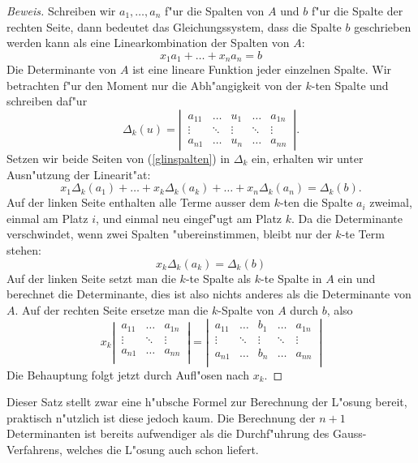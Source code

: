 \begin{proof}[Beweis]
Schreiben wir $a_1,\dots,a_n$ f"ur die Spalten von $A$ und $b$ f"ur die 
Spalte der rechten Seite, dann bedeutet das Gleichungssystem, dass die
Spalte $b$ geschrieben werden kann als eine Linearkombination der
Spalten von $A$:
\begin{equation}
x_1a_1+\dots +x_na_n=b
\label{glinspalten}
\end{equation}
Die Determinante von $A$ ist eine lineare Funktion jeder einzelnen Spalte.
Wir betrachten f"ur den Moment nur die Abh"angigkeit von der $k$-ten
Spalte und schreiben daf"ur
\[
\Delta_k(u)=\left|
\,\begin{matrix}
a_{11}&\dots&u_1&\dots&a_{1n}\\
\vdots&\ddots&\vdots&\ddots&\vdots\\
a_{n1}&\dots&u_n&\dots&a_{nn}
\end{matrix}
\,\right|.
\]
Setzen wir beide Seiten von (\ref{glinspalten}) in $\Delta_k$ ein,
erhalten wir unter Ausn"utzung der Linearit"at:
\[
x_1\Delta_k(a_1)+\dots+x_k\Delta_k(a_k)+\dots+x_n\Delta_k(a_n)=\Delta_k(b).
\]
Auf der linken Seite enthalten alle Terme ausser dem $k$-ten die
Spalte $a_i$ zweimal, einmal am Platz $i$, und einmal neu eingef"ugt am
Platz $k$.
Da die Determinante verschwindet, wenn zwei Spalten "ubereinstimmen,
bleibt nur der $k$-te Term stehen:
\[
x_k\Delta_k(a_k)=\Delta_k(b)
\]
Auf der linken Seite setzt man die $k$-te Spalte als $k$-te Spalte
in $A$ ein und berechnet die Determinante, dies ist also nichts
anderes als die Determinante von $A$.
Auf der rechten Seite ersetze man die $k$-Spalte von $A$ durch $b$, also
\[
x_k
\left|\,\begin{matrix}
a_{11}&\dots&a_{1n}\\
\vdots&\ddots&\vdots\\
a_{n1}&\dots&a_{nn}\\
\end{matrix}\,\right|
=
\left|\,\begin{matrix}
a_{11}&\dots&b_1&\dots&a_{1n}\\
\vdots&\ddots&\vdots&\ddots&\vdots\\
a_{n1}&\dots&b_n&\dots&a_{nn}\\
\end{matrix}\,\right|
\]
Die Behauptung folgt jetzt durch Aufl"osen nach $x_k$.
\end{proof}
Dieser Satz stellt zwar eine h"ubsche Formel zur Berechnung der L"osung
bereit, praktisch n"utzlich ist diese jedoch kaum.
Die Berechnung der
$n+1$ Determinanten ist bereits aufwendiger als die Durchf"uhrung des
Gauss-Verfahrens, welches die L"osung auch schon liefert.

